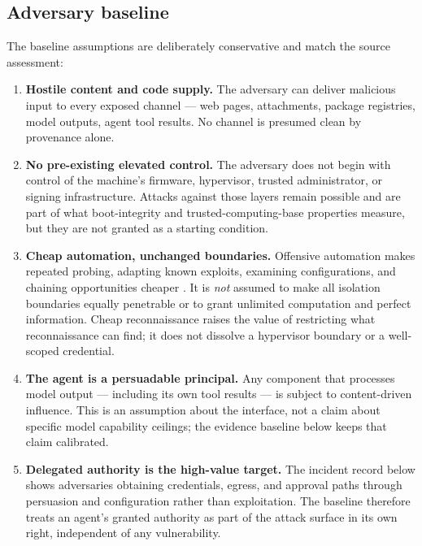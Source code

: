 \documentclass[
  english,
  9pt,
]{extarticle}
\providecommand{\tightlist}{%
  \setlength{\itemsep}{0pt}\setlength{\parskip}{0pt}}
\begin{document}
\subsection{Adversary baseline}\label{adversary-baseline}

The baseline assumptions are deliberately conservative and match the
source assessment:

\begin{enumerate}
\def\labelenumi{\arabic{enumi}.}
\tightlist
\item
  \textbf{Hostile content and code supply.} The adversary can deliver
  malicious input to every exposed channel --- web pages, attachments,
  package registries, model outputs, agent tool results. No channel is
  presumed clean by provenance alone.
\item
  \textbf{No pre-existing elevated control.} The adversary does not
  begin with control of the machine's firmware, hypervisor, trusted
  administrator, or signing infrastructure. Attacks against those layers
  remain possible and are part of what boot-integrity and
  trusted-computing-base properties measure, but they are not granted as
  a starting condition.
\item
  \textbf{Cheap automation, unchanged boundaries.} Offensive automation
  makes repeated probing, adapting known exploits, examining
  configurations, and chaining opportunities cheaper
  \citep{ncsc_ai_cyber_threat}. It is \emph{not} assumed to make all
  isolation boundaries equally penetrable or to grant unlimited
  computation and perfect information. Cheap reconnaissance raises the
  value of restricting what reconnaissance can find; it does not
  dissolve a hypervisor boundary or a well-scoped credential.
\item
  \textbf{The agent is a persuadable principal.} Any component that
  processes model output --- including its own tool results --- is
  subject to content-driven influence. This is an assumption about the
  interface, not a claim about specific model capability ceilings; the
  evidence baseline below keeps that claim calibrated.
\item
  \textbf{Delegated authority is the high-value target.} The incident
  record below shows adversaries obtaining credentials, egress, and
  approval paths through persuasion and configuration rather than
  exploitation. The baseline therefore treats an agent's granted
  authority as part of the attack surface in its own right, independent
  of any vulnerability.
\end{enumerate}
\end{document}
